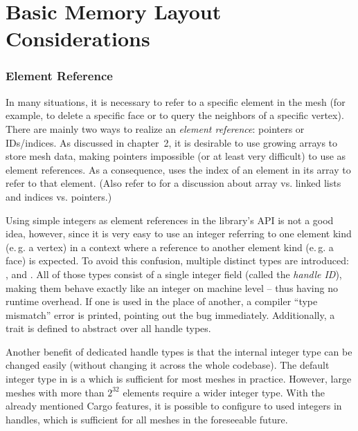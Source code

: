\section{Basic Memory Layout Considerations}
\label{chap:memory-layout}

\subsubsection*{Element Reference}

In many situations, it is necessary to refer to a specific element in the mesh (for example, to delete a specific face or to query the neighbors of a specific vertex).
There are mainly two ways to realize an \emph{element reference}: pointers or IDs/indices.
As discussed in chapter~2, it is desirable to use growing arrays to store mesh data, making pointers impossible (or at least very difficult) to use as element references.
As a consequence,  uses the index of an element in its array to refer to that element.
(Also refer to \cite{sieger2011design} for a discussion about array vs. linked lists and indices vs. pointers.)

Using simple integers as element references in the library's API is not a good idea, however, since it is very easy to use an integer referring to one element kind (e.\,g. a vertex) in a context where a reference to another element kind (e.\,g. a face) is expected.
To avoid this confusion, multiple distinct types are introduced: ,  and .
All of those types consist of a single integer field (called the \emph{handle ID}), making them behave exactly like an integer on machine level -- thus having no runtime overhead.
If one is used in the place of another, a compiler \enquote{type mismatch} error is printed, pointing out the bug immediately.
Additionally, a  trait is defined to abstract over all handle types.

Another benefit of dedicated handle types is that the internal integer type can be changed easily (without changing it across the whole codebase).
The default integer type in  is a  which is sufficient for most meshes in practice.
However, large meshes with more than $2^{32}$ elements require a wider integer type.
With the already mentioned Cargo features, it is possible to configure  to used  integers in handles, which is sufficient for all meshes in the foreseeable future.

\vspace{2cm}
